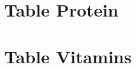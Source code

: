 \documentclass[../main.tex]{subfiles}
\begin{document}
\section{Table Protein}



\section{Table Vitamins}



%
\end{document}
